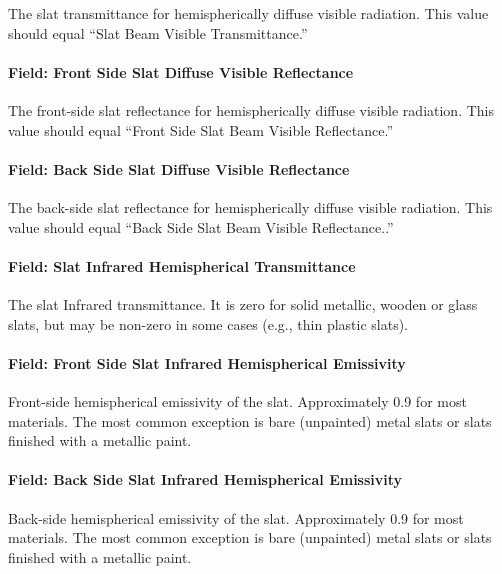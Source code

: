 The slat transmittance for hemispherically diffuse visible radiation. This value should equal ``Slat Beam Visible Transmittance.''

\paragraph{Field: Front Side Slat Diffuse Visible Reflectance}\label{field-front-side-slat-diffuse-visible-reflectance}

The front-side slat reflectance for hemispherically diffuse visible radiation. This value should equal ``Front Side Slat Beam Visible Reflectance.''

\paragraph{Field: Back Side Slat Diffuse Visible Reflectance}\label{field-back-side-slat-diffuse-visible-reflectance}

The back-side slat reflectance for hemispherically diffuse visible radiation. This value should equal ``Back Side Slat Beam Visible Reflectance..''

\paragraph{Field: Slat Infrared Hemispherical Transmittance}\label{field-slat-infrared-hemispherical-transmittance}

The slat Infrared transmittance. It is zero for solid metallic, wooden or glass slats, but may be non-zero in some cases (e.g., thin plastic slats).

\paragraph{Field: Front Side Slat Infrared Hemispherical Emissivity}\label{field-front-side-slat-infrared-hemispherical-emissivity}

Front-side hemispherical emissivity of the slat. Approximately 0.9 for most materials. The most common exception is bare (unpainted) metal slats or slats finished with a metallic paint.

\paragraph{Field: Back Side Slat Infrared Hemispherical Emissivity}\label{field-back-side-slat-infrared-hemispherical-emissivity}

Back-side hemispherical emissivity of the slat. Approximately 0.9 for most materials. The most common exception is bare (unpainted) metal slats or slats finished with a metallic paint.

